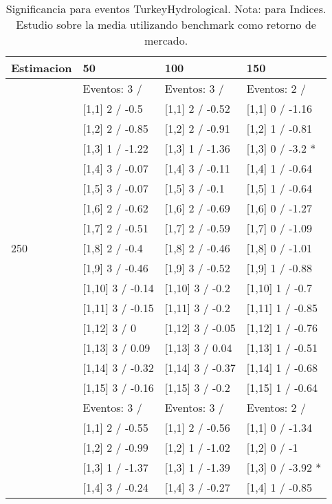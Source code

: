 \begin{table}

\caption{Significancia para eventos TurkeyHydrological. Nota: para Indices. Estudio sobre la media utilizando benchmark como retorno de mercado.}
\centering
\begin{tabular}[t]{llll}
\toprule
Estimacion & 50 & 100 & 150\\
\midrule
 & Eventos:  3 / & Eventos:  3 / & Eventos:  2 /\\
 & {}[1,1] 2  / -0.5 & {}[1,1] 2  / -0.52 & {}[1,1] 0  / -1.16\\
 & {}[1,2] 2  / -0.85 & {}[1,2] 2  / -0.91 & {}[1,2] 1  / -0.81\\
 & {}[1,3] 1  / -1.22 & {}[1,3] 1  / -1.36 & {}[1,3] 0  / -3.2 *\\
 & {}[1,4] 3  / -0.07 & {}[1,4] 3  / -0.11 & {}[1,4] 1  / -0.64\\
\addlinespace
 & {}[1,5] 3  / -0.07 & {}[1,5] 3  / -0.1 & {}[1,5] 1  / -0.64\\
 & {}[1,6] 2  / -0.62 & {}[1,6] 2  / -0.69 & {}[1,6] 0  / -1.27\\
 & {}[1,7] 2  / -0.51 & {}[1,7] 2  / -0.59 & {}[1,7] 0  / -1.09\\
250 & {}[1,8] 2  / -0.4 & {}[1,8] 2  / -0.46 & {}[1,8] 0  / -1.01\\
 & {}[1,9] 3  / -0.46 & {}[1,9] 3  / -0.52 & {}[1,9] 1  / -0.88\\
\addlinespace
 & {}[1,10] 3  / -0.14 & {}[1,10] 3  / -0.2 & {}[1,10] 1  / -0.7\\
 & {}[1,11] 3  / -0.15 & {}[1,11] 3  / -0.2 & {}[1,11] 1  / -0.85\\
 & {}[1,12] 3  / 0 & {}[1,12] 3  / -0.05 & {}[1,12] 1  / -0.76\\
 & {}[1,13] 3  / 0.09 & {}[1,13] 3  / 0.04 & {}[1,13] 1  / -0.51\\
 & {}[1,14] 3  / -0.32 & {}[1,14] 3  / -0.37 & {}[1,14] 1  / -0.68\\
\addlinespace
 & {}[1,15] 3  / -0.16 & {}[1,15] 3  / -0.2 & {}[1,15] 1  / -0.64\\
 & Eventos:  3 / & Eventos:  3 / & Eventos:  2 /\\
 & {}[1,1] 2  / -0.55 & {}[1,1] 2  / -0.56 & {}[1,1] 0  / -1.34\\
 & {}[1,2] 2  / -0.99 & {}[1,2] 1  / -1.02 & {}[1,2] 0  / -1\\
 & {}[1,3] 1  / -1.37 & {}[1,3] 1  / -1.39 & {}[1,3] 0  / -3.92 *\\
\addlinespace
 & {}[1,4] 3  / -0.24 & {}[1,4] 3  / -0.27 & {}[1,4] 1  / -0.85\\

\end{tabular}
\end{table}
